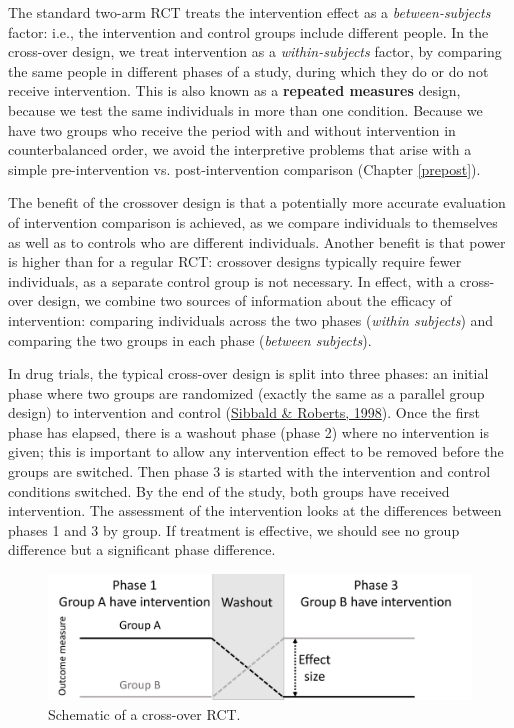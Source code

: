 \documentclass{krantz}
\begin{document}
The standard two-arm RCT treats the intervention effect as a \emph{between-subjects} factor: i.e., the intervention and control groups include different people. In the cross-over design, we treat intervention as a \emph{within-subjects} factor, by comparing the same people in different phases of a study, during which they do or do not receive intervention. This is also known as a \textbf{repeated measures} design, because we test the same individuals in more than one condition. Because we have two groups who receive the period with and without intervention in counterbalanced order, we avoid the interpretive problems that arise with a simple pre-intervention vs. post-intervention comparison (Chapter \ref{prepost}).

The benefit of the crossover design is that a potentially more accurate evaluation of intervention comparison is achieved, as we compare individuals to themselves as well as to controls who are different individuals. Another benefit is that power is higher than for a regular RCT: crossover designs typically require fewer individuals, as a separate control group is not necessary. In effect, with a cross-over design, we combine two sources of information about the efficacy of intervention: comparing individuals across the two phases (\emph{within subjects}) and comparing the two groups in each phase (\emph{between subjects}).

In drug trials, the typical cross-over design is split into three phases: an initial phase where two groups are randomized (exactly the same as a parallel group design) to intervention and control (\protect\hyperlink{ref-sibbald1998}{Sibbald \& Roberts, 1998}). Once the first phase has elapsed, there is a washout phase (phase 2) where no intervention is given; this is important to allow any intervention effect to be removed before the groups are switched. Then phase 3 is started with the intervention and control conditions switched. By the end of the study, both groups have received intervention. The assessment of the intervention looks at the differences between phases 1 and 3 by group. If treatment is effective, we should see no group difference but a significant phase difference.

\begin{figure}
\includegraphics[width=0.85\linewidth]{images_bw/crossover} \caption{Schematic of a cross-over RCT.}\label{fig:crossoverplot}
\end{figure}
\end{document}
